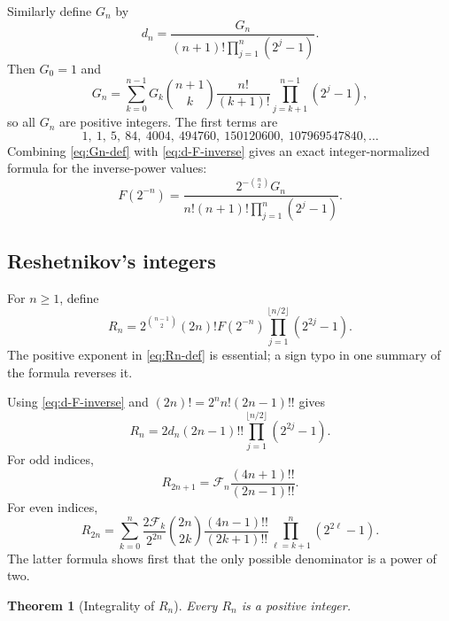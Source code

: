 \documentclass[11pt]{article}
\numberwithin{equation}{section}
\newtheorem{theorem}{Theorem}[section]
\theoremstyle{definition}
\theoremstyle{remark}
\begin{document}
Similarly define $G_n$ by
\begin{equation}\label{eq:Gn-def}
 d_n=\frac{G_n}{(n+1)!\prod_{j=1}^{n}(2^j-1)}.
\end{equation}
Then $G_0=1$ and
\begin{equation}\label{eq:Gn-recurrence}
 G_n=\sum_{k=0}^{n-1}G_k\binom{n+1}{k}
 \frac{n!}{(k+1)!}
 \prod_{j=k+1}^{n-1}(2^j-1),
\end{equation}
so all $G_n$ are positive integers.  The first terms are
\[
 1,\ 1,\ 5,\ 84,\ 4004,\ 494760,\ 150120600,
 \ 107969547840,\ldots
\]
Combining \eqref{eq:Gn-def} with \eqref{eq:d-F-inverse} gives an exact
integer-normalized formula for the inverse-power values:
\begin{equation}\label{eq:F-inverse-G}
 F(2^{-n})=
 \frac{2^{-\binom n2}G_n}
 {n!(n+1)!\prod_{j=1}^{n}(2^j-1)}.
\end{equation}

\subsection{Reshetnikov's integers}

For $n\ge1$, define
\begin{equation}\label{eq:Rn-def}
 R_n=2^{\binom{n-1}{2}}(2n)!F(2^{-n})
 \prod_{j=1}^{\lfloor n/2\rfloor}(2^{2j}-1).
\end{equation}
The positive exponent in \eqref{eq:Rn-def} is essential; a sign typo in one
summary of the formula reverses it.

Using \eqref{eq:d-F-inverse} and
$(2n)!=2^n n!(2n-1)!!$ gives
\begin{equation}\label{eq:Rn-dn}
 R_n=2d_n(2n-1)!!
 \prod_{j=1}^{\lfloor n/2\rfloor}(2^{2j}-1).
\end{equation}
For odd indices,
\begin{equation}\label{eq:R-odd}
 R_{2n+1}=\mathcal F_n\frac{(4n+1)!!}{(2n-1)!!}.
\end{equation}
For even indices,
\begin{equation}\label{eq:R-even}
 R_{2n}=\sum_{k=0}^{n}
 \frac{2\mathcal F_k}{2^{2n}}\binom{2n}{2k}
 \frac{(4n-1)!!}{(2k+1)!!}
 \prod_{\ell=k+1}^{n}(2^{2\ell}-1).
\end{equation}
The latter formula shows first that the only possible denominator is a power
of two.

\begin{theorem}[Integrality of $R_n$]\label{thm:R-integer}
Every $R_n$ is a positive integer.
\end{theorem}
\end{document}
